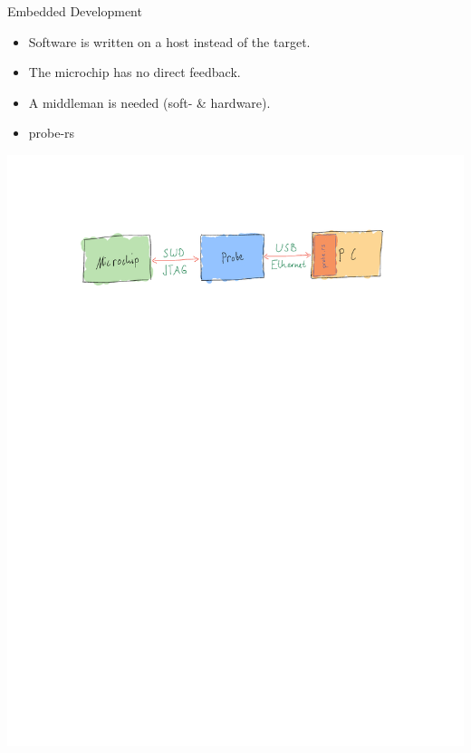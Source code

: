 \documentclass[aspectratio=1610,14pt,t]{beamer}
\begin{document}
\begin{frame}[c]{Embedded Development}
  \begin{itemize}
    \item Software is written on a host instead of the target.
    \item The microchip has no direct feedback.
    \item A middleman is needed (soft- \& hardware).
    \item probe-rs
  \end{itemize}
  \includegraphics[trim=2.5cm 0 0 2cm, clip, height=2.5\textheight]{./img/probe-chain.pdf}
\end{frame}
\end{document}
